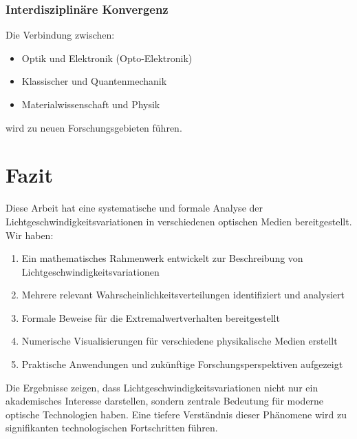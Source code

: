 \documentclass[a4paper,12pt]{article}
\theoremstyle{definition}
\theoremstyle{remark}
\begin{document}
\subsubsection{Interdisziplinäre Konvergenz}

Die Verbindung zwischen:
\begin{itemize}
    \item Optik und Elektronik (Opto-Elektronik)
    \item Klassischer und Quantenmechanik
    \item Materialwissenschaft und Physik
\end{itemize}
wird zu neuen Forschungsgebieten führen.

\section{Fazit}

Diese Arbeit hat eine systematische und formale Analyse der Lichtgeschwindigkeitsvariationen in verschiedenen optischen Medien bereitgestellt. Wir haben:

\begin{enumerate}
    \item Ein mathematisches Rahmenwerk entwickelt zur Beschreibung von Lichtgeschwindigkeitsvariationen
    \item Mehrere relevant Wahrscheinlichkeitsverteilungen identifiziert und analysiert
    \item Formale Beweise für die Extremalwertverhalten bereitgestellt
    \item Numerische Visualisierungen für verschiedene physikalische Medien erstellt
    \item Praktische Anwendungen und zukünftige Forschungsperspektiven aufgezeigt
\end{enumerate}

Die Ergebnisse zeigen, dass Lichtgeschwindigkeitsvariationen nicht nur ein akademisches Interesse darstellen, sondern zentrale Bedeutung für moderne optische Technologien haben. Eine tiefere Verständnis dieser Phänomene wird zu signifikanten technologischen Fortschritten führen.
\end{document}
